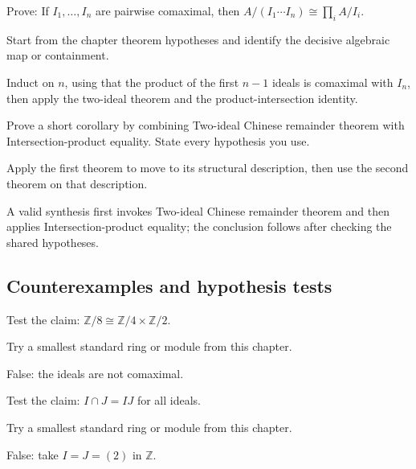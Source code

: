 \begin{exercise}\label{exr:v04-expand-08}
Prove: If $I_1,\dots,I_n$ are pairwise comaximal, then $A/(I_1\cdots I_n)\cong\prod_i A/I_i$.
\end{exercise}
\begin{hint}
Start from the chapter theorem hypotheses and identify the decisive algebraic map or containment.
\end{hint}
\begin{solution}
Induct on $n$, using that the product of the first $n-1$ ideals is comaximal with $I_n$, then apply the two-ideal theorem and the product-intersection identity.
\end{solution}

\begin{exercise}\label{exr:v04-expand-09}
Prove a short corollary by combining Two-ideal Chinese remainder theorem with Intersection-product equality. State every hypothesis you use.
\end{exercise}
\begin{hint}
Apply the first theorem to move to its structural description, then use the second theorem on that description.
\end{hint}
\begin{solution}
A valid synthesis first invokes Two-ideal Chinese remainder theorem and then applies Intersection-product equality; the conclusion follows after checking the shared hypotheses.
\end{solution}

\subsection*{Counterexamples and hypothesis tests}

\begin{exercise}\label{exr:v04-expand-10}
Test the claim: $\mathbb Z/8\cong\mathbb Z/4\times\mathbb Z/2$.
\end{exercise}
\begin{hint}
Try a smallest standard ring or module from this chapter.
\end{hint}
\begin{solution}
False: the ideals are not comaximal.
\end{solution}

\begin{exercise}\label{exr:v04-expand-11}
Test the claim: $I\cap J=IJ$ for all ideals.
\end{exercise}
\begin{hint}
Try a smallest standard ring or module from this chapter.
\end{hint}
\begin{solution}
False: take $I=J=(2)$ in $\mathbb Z$.
\end{solution}

